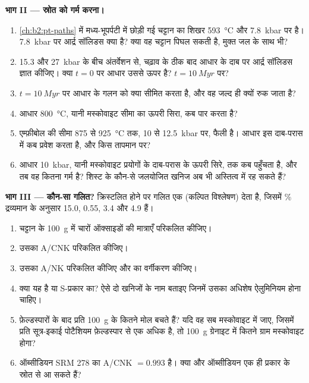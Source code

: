 \begin{problem}[{सप्ताहांत समस्या --- पिघले अभ्रक से एक प्लूटॉन}]
\noindent\textbf{भाग II --- स्रोत को गर्म करना।}
\begin{enumerate}[resume]
\item \cref{ch:b2:pt-paths} में मध्य-भूपर्पटी में छोड़ी गई चट्टान का शिखर \qty{593}{\celsius}
और \qty{7.8}{kbar} पर है। \qty{7.8}{kbar} पर आर्द्र सॉलिडस क्या है? क्या वह चट्टान पिघल सकती है,
मुक्त जल के साथ भी?
\item 15.3 और \qty{27}{kbar} के बीच अंतर्वेशन से, चढ़ाव के ठीक बाद आधार के दाब पर
आर्द्र सॉलिडस ज्ञात कीजिए। क्या $t = 0$ पर आधार उससे ऊपर है? $t = \qty{10}{Myr}$ पर?
\item $t = \qty{10}{Myr}$ पर आधार के गलन को क्या सीमित करता है, और वह जल्द ही
क्यों रुक जाता है?
\item आधार \qty{800}{\celsius}, यानी मस्कोवाइट सीमा का ऊपरी सिरा, कब
पार करता है?
\item एम्फ़ीबोल की सीमा 875 से \qty{925}{\celsius} तक, 10 से \qty{12.5}{kbar} पर, फैली है।
आधार इस दाब-परास में कब प्रवेश करता है, और किस तापमान पर?
\item आधार \qty{10}{kbar}, यानी मस्कोवाइट प्रयोगों के दाब-परास के ऊपरी सिरे, तक कब पहुँचता है,
और तब वह कितना गर्म है? शिस्ट के कौन-से जलयोजित खनिज अब भी
अस्तित्व में रह सकते हैं?
\end{enumerate}

\noindent\textbf{भाग III --- कौन-सा गलित?}
क्रिस्टलित होने पर गलित एक  (कल्पित विश्लेषण) देता है, जिसमें
\unit{\percent} द्रव्यमान के अनुसार  15.0,  0.55,  3.4 और  4.9 हैं।
\begin{enumerate}[resume]
\item चट्टान के \qty{100}{\gram} में चारों ऑक्साइडों की मात्राएँ परिकलित कीजिए।
\item उसका A/CNK परिकलित कीजिए।
\item उसका A/NK परिकलित कीजिए और  का वर्गीकरण कीजिए।
\item क्या यह  है या S-प्रकार का? ऐसे दो खनिजों के नाम बताइए जिनमें उसका अधिशेष
ऐलुमिनियम होना चाहिए।
\item फ़ेल्डस्पारों के बाद प्रति \qty{100}{\gram}  के कितने मोल बचते हैं? यदि
वह सब मस्कोवाइट में जाए, जिसमें प्रति सूत्र-इकाई पोटैशियम फ़ेल्डस्पार से एक  अधिक
है, तो \qty{100}{\gram} ग्रेनाइट में कितने ग्राम मस्कोवाइट
होगा?
\item ऑब्सीडियन SRM 278 का A/CNK $= 0.993$ है। क्या  और ऑब्सीडियन
एक ही प्रकार के स्रोत से आ सकते हैं?
\end{enumerate}


\end{problem}

